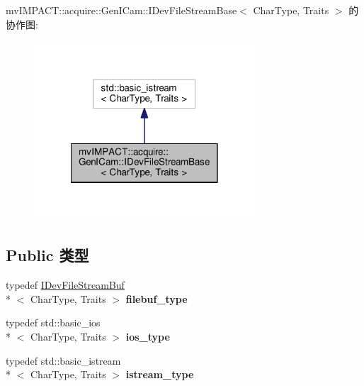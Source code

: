 mv\+I\+M\+P\+A\+C\+T\+:\+:acquire\+:\+:Gen\+I\+Cam\+:\+:I\+Dev\+File\+Stream\+Base$<$ Char\+Type, Traits $>$ 的协作图\+:
\nopagebreak
\begin{figure}[H]
\begin{center}
\leavevmode
\includegraphics[width=234pt]{classmv_i_m_p_a_c_t_1_1acquire_1_1_gen_i_cam_1_1_i_dev_file_stream_base__coll__graph}
\end{center}
\end{figure}
\subsection*{Public 类型}
\begin{DoxyCompactItemize}
\item 
\hypertarget{classmv_i_m_p_a_c_t_1_1acquire_1_1_gen_i_cam_1_1_i_dev_file_stream_base_ab11c9fff3c10ad4507559e1af719d37b}{typedef \hyperlink{classmv_i_m_p_a_c_t_1_1acquire_1_1_gen_i_cam_1_1_i_dev_file_stream_buf}{I\+Dev\+File\+Stream\+Buf}\\*
$<$ Char\+Type, Traits $>$ {\bfseries filebuf\+\_\+type}}\label{classmv_i_m_p_a_c_t_1_1acquire_1_1_gen_i_cam_1_1_i_dev_file_stream_base_ab11c9fff3c10ad4507559e1af719d37b}

\item 
\hypertarget{classmv_i_m_p_a_c_t_1_1acquire_1_1_gen_i_cam_1_1_i_dev_file_stream_base_a790d03157fd8f6935e7f75b8ea07cdae}{typedef std\+::basic\+\_\+ios\\*
$<$ Char\+Type, Traits $>$ {\bfseries ios\+\_\+type}}\label{classmv_i_m_p_a_c_t_1_1acquire_1_1_gen_i_cam_1_1_i_dev_file_stream_base_a790d03157fd8f6935e7f75b8ea07cdae}

\item 
\hypertarget{classmv_i_m_p_a_c_t_1_1acquire_1_1_gen_i_cam_1_1_i_dev_file_stream_base_a06e3b8c0ac3faf276f125e65e36b64f7}{typedef std\+::basic\+\_\+istream\\*
$<$ Char\+Type, Traits $>$ {\bfseries istream\+\_\+type}}\label{classmv_i_m_p_a_c_t_1_1acquire_1_1_gen_i_cam_1_1_i_dev_file_stream_base_a06e3b8c0ac3faf276f125e65e36b64f7}

\end{DoxyCompactItemize}
